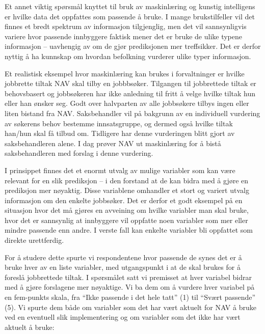 \documentclass[
  12pt,
  a4paper, 12pt]{article}
\begin{document}
Et annet viktig spørsmål knyttet til bruk av maskinlæring og kunstig intelligens er hvilke data det oppfattes som passende å bruke.
I mange brukstilfeller vil det finnes et bredt spektrum av informasjon tilgjenglig, men det vil sannsynligvis variere hvor passende innbyggere faktisk mener det er bruke de ulike typene informasjon -- uavhengig av om de gjør prediksjonen mer treffsikker.
Det er derfor nyttig å ha kunnskap om hvordan befolkning vurderer ulike typer informasjon.

Et realistisk eksempel hvor maskinlæring kan brukes i forvaltninger er hvilke jobbrette tiltak NAV skal tilby en jobbbsøker. Tilgangen til jobbrettede tiltak er behovsbasert og jobbsøkeren har ikke anledning til fritt å velge hvilke tiltak hun eller han ønsker seg. Godt over halvparten av alle jobbsøkere tilbys ingen eller liten bistand fra NAV. Saksbehandler vil på bakgrunn av en individuell vurdering av søkerens behov bestemme innsatsgruppe, og dermed også hvilke tiltak han/hun skal få tilbud om. Tidligere har denne vurderingen blitt gjort av saksbehandleren alene. I dag prøver NAV ut maskinlæring for å bistå saksbehandleren med forslag i denne vurdering.

I prinsippet finnes det et enormt utvalg av mulige variabler som kan være relevant for en slik prediksjon -- i den forstand at de kan bidra med å gjøre en prediksjon mer nøyaktig. Disse variablene omhandler et stort og variert utvalg informasjon om den enkelte jobbsøker. Det er derfor et godt eksempel på en situasjon hvor det må gjøres en avveining om hvilke variabler man skal bruke, hvor det er sannsynlig at innbyggere vil oppfatte noen variabler som mer eller mindre passende enn andre. I verste fall kan enkelte variabler bli oppfattet som direkte urettferdig.

For å studere dette spurte vi respondentene hvor passende de synes det er å bruke hver av en liste variabler, med utgangspunkt i at de skal brukes for å foreslå jobbrettede tiltak. I spørsmålet satt vi premisset at hver variabel bidrar med å gjøre forslagene mer nøyaktige. Vi ba dem om å vurdere hver variabel på en fem-punkts skala, fra ``Ikke passende i det hele tatt'' (1) til ``Svært passende'' (5). Vi spurte dem både om variabler som det har vært aktuelt for NAV å bruke ved en eventuell slik implementering og om variabler som det ikke har vært aktuelt å bruke:
\end{document}

